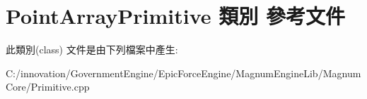 \hypertarget{class_point_array_primitive}{}\section{Point\+Array\+Primitive 類別 參考文件}
\label{class_point_array_primitive}


此類別(class) 文件是由下列檔案中產生\+:\begin{DoxyCompactItemize}
\item 
C\+:/innovation/\+Government\+Engine/\+Epic\+Force\+Engine/\+Magnum\+Engine\+Lib/\+Magnum\+Core/Primitive.\+cpp\end{DoxyCompactItemize}
